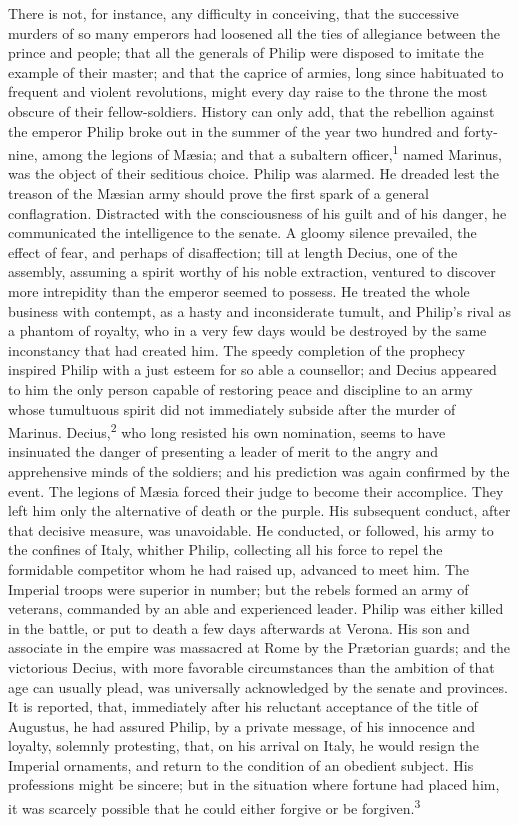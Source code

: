 There is not, for instance, any difficulty in conceiving, that
the successive murders of so many emperors had loosened all the
ties of allegiance between the prince and people; that all the
generals of Philip were disposed to imitate the example of their
master; and that the caprice of armies, long since habituated to
frequent and violent revolutions, might every day raise to the
throne the most obscure of their fellow-soldiers. History can
only add, that the rebellion against the emperor Philip broke out
in the summer of the year two hundred and forty-nine, among the
legions of Mæsia; and that a subaltern officer,\textsuperscript{1} named Marinus,
was the object of their seditious choice. Philip was alarmed. He
dreaded lest the treason of the Mæsian army should prove the
first spark of a general conflagration. Distracted with the
consciousness of his guilt and of his danger, he communicated the
intelligence to the senate. A gloomy silence prevailed, the
effect of fear, and perhaps of disaffection; till at length
Decius, one of the assembly, assuming a spirit worthy of his
noble extraction, ventured to discover more intrepidity than the
emperor seemed to possess. He treated the whole business with
contempt, as a hasty and inconsiderate tumult, and Philip’s rival
as a phantom of royalty, who in a very few days would be
destroyed by the same inconstancy that had created him. The
speedy completion of the prophecy inspired Philip with a just
esteem for so able a counsellor; and Decius appeared to him the
only person capable of restoring peace and discipline to an army
whose tumultuous spirit did not immediately subside after the
murder of Marinus. Decius,\textsuperscript{2} who long resisted his own
nomination, seems to have insinuated the danger of presenting a
leader of merit to the angry and apprehensive minds of the
soldiers; and his prediction was again confirmed by the event.
The legions of Mæsia forced their judge to become their
accomplice. They left him only the alternative of death or the
purple. His subsequent conduct, after that decisive measure, was
unavoidable. He conducted, or followed, his army to the confines
of Italy, whither Philip, collecting all his force to repel the
formidable competitor whom he had raised up, advanced to meet
him. The Imperial troops were superior in number; but the rebels
formed an army of veterans, commanded by an able and experienced
leader. Philip was either killed in the battle, or put to death a
few days afterwards at Verona. His son and associate in the
empire was massacred at Rome by the Prætorian guards; and the
victorious Decius, with more favorable circumstances than the
ambition of that age can usually plead, was universally
acknowledged by the senate and provinces. It is reported, that,
immediately after his reluctant acceptance of the title of
Augustus, he had assured Philip, by a private message, of his
innocence and loyalty, solemnly protesting, that, on his arrival
on Italy, he would resign the Imperial ornaments, and return to
the condition of an obedient subject. His professions might be
sincere; but in the situation where fortune had placed him, it
was scarcely possible that he could either forgive or be
forgiven.\textsuperscript{3}


